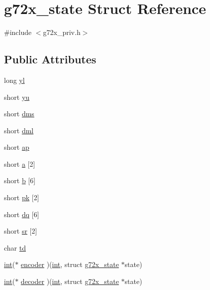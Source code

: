 \hypertarget{structg72x__state}{}\section{g72x\+\_\+state Struct Reference}
\label{structg72x__state}


{\ttfamily \#include $<$g72x\+\_\+priv.\+h$>$}

\subsection*{Public Attributes}
\begin{DoxyCompactItemize}
\item 
long \hyperlink{structg72x__state_a807b5e84c2d64ee7776b2edca8de67f4}{yl}
\item 
short \hyperlink{structg72x__state_a9b01934f60d42320e079a57e0b977d6d}{yu}
\item 
short \hyperlink{structg72x__state_a779d505204749451fdca216900b6d551}{dms}
\item 
short \hyperlink{structg72x__state_adbb9567904fa064d33382ef21d9001e8}{dml}
\item 
short \hyperlink{structg72x__state_ad26205671030ec76f87bf86248241b3f}{ap}
\item 
short \hyperlink{structg72x__state_a0cb2efc8e71a7ebda36711f1bde39b7a}{a} \mbox{[}2\mbox{]}
\item 
short \hyperlink{structg72x__state_a79a0dbc644fa660bc668b6c36ba1cdc1}{b} \mbox{[}6\mbox{]}
\item 
short \hyperlink{structg72x__state_a0f0b967ab4c0f8289d35c4c856546916}{pk} \mbox{[}2\mbox{]}
\item 
short \hyperlink{structg72x__state_a6fb589b044f78716df5652a23d46096a}{dq} \mbox{[}6\mbox{]}
\item 
short \hyperlink{structg72x__state_a56fe911169dcc64da9b6854f60a42828}{sr} \mbox{[}2\mbox{]}
\item 
char \hyperlink{structg72x__state_abade7a62852e6a8ec7fc171d053da56c}{td}
\item 
\hyperlink{xmltok_8h_a5a0d4a5641ce434f1d23533f2b2e6653}{int}($\ast$ \hyperlink{structg72x__state_aa42808c5c6a028645b15b6cfcce00f2c}{encoder} )(\hyperlink{xmltok_8h_a5a0d4a5641ce434f1d23533f2b2e6653}{int}, struct \hyperlink{structg72x__state}{g72x\+\_\+state} $\ast$state)
\item 
\hyperlink{xmltok_8h_a5a0d4a5641ce434f1d23533f2b2e6653}{int}($\ast$ \hyperlink{structg72x__state_a803587e10ca7c86d52eafc2cc81fce04}{decoder} )(\hyperlink{xmltok_8h_a5a0d4a5641ce434f1d23533f2b2e6653}{int}, struct \hyperlink{structg72x__state}{g72x\+\_\+state} $\ast$state)

\end{DoxyCompactItemize}
